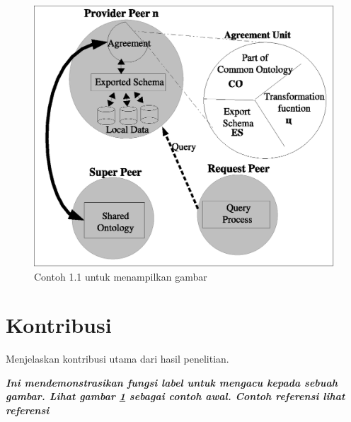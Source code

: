  
\begin{figure}[tb]
\vspace{-0.3cm}
\begin{center}
\includegraphics[width=0.7\columnwidth]{bab1/ContohGbr1_1.eps}
\end{center}
\vspace{-0.5cm}
\caption{\small Contoh 1.1 untuk menampilkan gambar \label{fig:1-contoh1.1}}
\end{figure}


\section{Kontribusi}
\label{sec:1-Kontribusi}
Menjelaskan kontribusi utama dari hasil penelitian.

\textit{\textbf{Ini mendemonstrasikan fungsi label untuk mengacu kepada sebuah gambar. Lihat gambar \ref{fig:1-contoh1.1} sebagai contoh awal. Contoh referensi lihat referensi \cite{Sheth:b}}
}